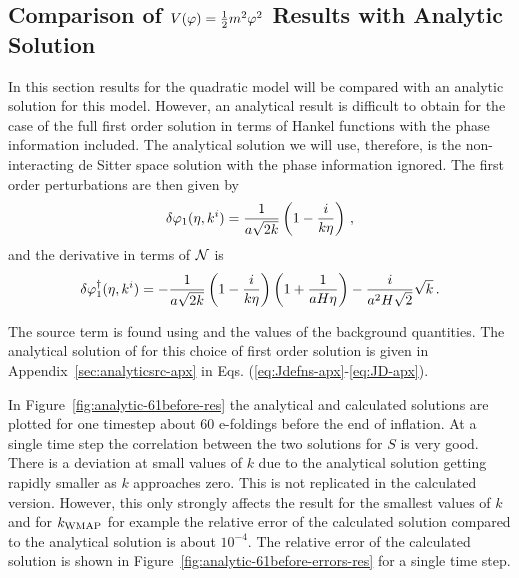 \subsection{Comparison of \texorpdfstring{$V(\varphi)=\frac{1}{2} m^2 \varphi^2$}{m-squared Model} Results with Analytic
Solution}
\label{sec:analytic-res}
In this section results for the quadratic model will be compared with an analytic solution for this
model. However, an analytical result is difficult to obtain for the case of the full first
order solution in terms of Hankel functions with the phase information included. The analytical
solution we will use, therefore, is the non-interacting de Sitter
space solution with the phase information ignored. The first order perturbations are then given by
% 
\begin{equation}
 \delta\varphi_{1}(\eta, k^i) = \frac{1}{a\sqrt{2 k}} \left( 1 - \frac{i}{k \eta}\right) \,,
\end{equation}
% 
and the derivative in terms of $\mathcal{N}$ is 
% 
\begin{equation}
 \delta\varphi_{1}^{\dagger}(\eta, k^i) = -  \frac{1}{a\sqrt{2 k}} \left( 1 -
                        \frac{i}{k \eta}\right) \left(1 + \frac{1}{aH\eta}\right)
                         - \frac{i}{a^2 H \sqrt{2}}\sqrt{k}\,.
\end{equation}
% 

The source term is found using  and the values of the background
quantities. The analytical solution of  for this choice of first order
solution is given in Appendix~\ref{sec:analyticsrc-apx} in Eqs.
(\ref{eq:Jdefns-apx}-\ref{eq:JD-apx}).

In Figure~\ref{fig:analytic-61before-res} the analytical and calculated solutions are plotted for
one timestep about 60 e-foldings before the end of inflation. At a single time step the correlation
between the two solutions for $S$ is very good. There is a deviation at small
values of $k$ due to the analytical solution getting rapidly smaller as $k$ approaches zero. This
 is not replicated in the calculated version. However, this only strongly affects the
result for the smallest values of $k$ and for $k_\mathrm{WMAP}$ for example the relative error of the
calculated solution compared to the analytical solution is about $10^{-4}$. The relative error of
the calculated solution is shown in Figure~\ref{fig:analytic-61before-errors-res} for a single time
step.

